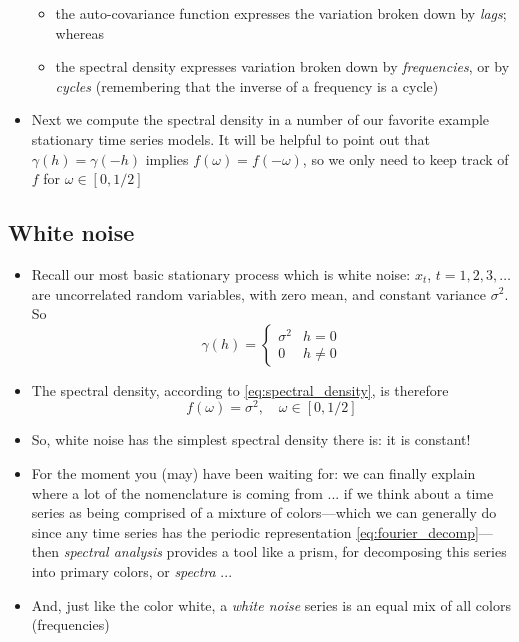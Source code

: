 \documentclass{article}
\begin{document}
\begin{itemize}
\begin{itemize}
\item the auto-covariance function expresses the variation broken down by
  \emph{lags}; whereas 
\item the spectral density expresses variation broken down by
  \emph{frequencies}, or by \emph{cycles} (remembering that the inverse of a 
  frequency is a cycle)   
\end{itemize}

\item Next we compute the spectral density in a number of our favorite example
  stationary time series models. It will be helpful to point out that $\gamma(h)
  = \gamma(-h)$ implies $f(\omega) = f(-\omega)$, so we only need to keep track
  of $f$ for $\omega \in [0, 1/2]$ 
\end{itemize}

\subsection{White noise}

\begin{itemize}
\item Recall our most basic stationary process which is white noise: $x_t$, $t = 
  1,2,3,\dots$ are uncorrelated random variables, with zero mean, and constant 
  variance $\sigma^2$. So
  \[
  \gamma(h) = \begin{cases} 
    \sigma^2 & h = 0 \\
    0 & h \not= 0
  \end{cases}
  \]
 
\item The spectral density, according to \eqref{eq:spectral_density}, is
  therefore
  \[
  f(\omega) = \sigma^2, \quad \omega \in [0, 1/2]
  \]

\item So, white noise has the simplest spectral density there is: it is constant! 

\item For the moment you (may) have been waiting for: we can finally explain
  where a lot of the nomenclature is coming from ... if we think about a time
  series as being comprised of a mixture of colors---which we can generally do
  since any time series has the periodic representation
  \eqref{eq:fourier_decomp}---then \emph{spectral analysis} provides a tool like
  a prism, for decomposing this series into primary colors, or \emph{spectra}
  ...  

\item And, just like the color white, a \emph{white noise} series is an equal
  mix of all colors (frequencies) 
\end{itemize}
\end{document}
